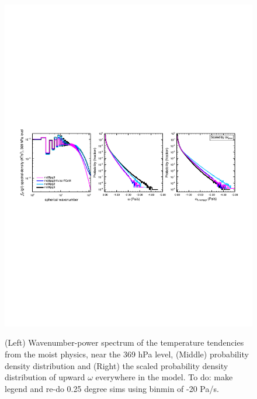\documentclass{agujournal}
\begin{document}
\begin{figure}[t]
\begin{center}
\noindent\includegraphics[width=30pc,angle=0]{figs/panel_ne20pg2-ne30pg2-ne30pg3.pdf}\\
\end{center}
\caption{(Left) Wavenumber-power spectrum of the temperature tendencies from the moist physics, near the 369 hPa level, (Middle) probability density distribution and (Right) the scaled probability density distribution of upward $\omega$ everywhere in the model. {\color{red}To do: make legend and re-do 0.25 degree sims using binmin of -20 Pa/s.}}
\label{fig:pgXpanel}
\end{figure}
\end{document}
